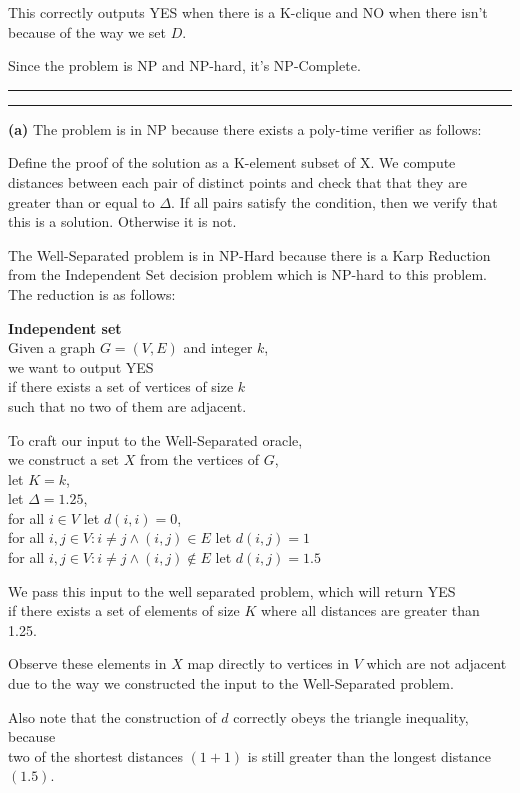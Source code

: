 \documentclass[11pt]{article}
\newcommand{\question}[2] {\vspace{.25in} \hrule\vspace{0.5em}
\noindent{\bf #1: #2} \vspace{0.5em}
\hrule \vspace{.10in}}
\renewcommand{\part}[1] {\vspace{.10in} {\bf (#1)}}
\begin{document}
This correctly outputs YES when there is a K-clique and NO when there isn't because of the way we set $D$.

Since the problem is NP and NP-hard, it's NP-Complete.

\question{3}{A Well-Separated Problem}
\part{a}
The problem is in NP because there exists a poly-time verifier as follows:

Define the proof of the solution as a K-element subset of X. We compute distances
between each pair of distinct points and check that that they are greater than or equal to $\Delta$.
If all pairs satisfy the condition, then we verify that this is a solution. Otherwise it is not.

The Well-Separated problem is in NP-Hard because there is a Karp Reduction from the Independent Set decision problem which is NP-hard to this problem.
The reduction is as follows:

\textbf{Independent set}\\
Given a graph $G = (V,E)$ and integer $k$,\\
we want to output YES\\
if there exists a set of vertices of size $k$\\
such that no two of them are adjacent.

To craft our input to the Well-Separated oracle,\\
we construct a set $X$ from the vertices of $G$,\\
let $K = k$,\\
let $\Delta = 1.25$,\\
for all $i \in V$ let $d(i,i) = 0$,\\
for all $i,j \in V : i \neq j \wedge (i,j) \in E$ let $d(i,j) = 1$\\
for all $i,j \in V : i \neq j \wedge (i,j) \notin E$ let $d(i,j) = 1.5$

We pass this input to the well separated problem, which will return YES\\
if there exists a set of elements of size $K$ where all distances are greater than 1.25.

Observe these elements in $X$ map directly to vertices in $V$ which are not adjacent\\
due to the way we constructed the input to the Well-Separated problem.

Also note that the construction of $d$ correctly obeys the triangle inequality, because\\
two of the shortest distances $(1 + 1)$ is still greater than the longest distance $(1.5)$.
\end{document}
